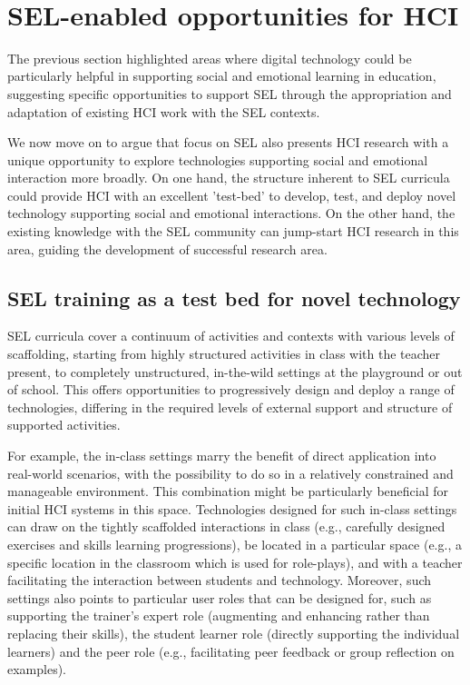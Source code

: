 \documentclass[prodmode,acmtochi]{acmsmall}
\begin{document}



\vfill ~ \pagebreak
\section{SEL-enabled opportunities for HCI} %
\label{sec:HCIopportunities}
The previous section highlighted areas where digital technology could be particularly helpful in supporting social and emotional learning in education, suggesting specific opportunities to support SEL through the appropriation and adaptation of existing HCI work with the SEL contexts. 

We now move on to argue that focus on SEL also presents HCI research with a unique opportunity to explore technologies supporting social and emotional interaction more broadly.
%
On one hand, the structure inherent to SEL curricula could provide HCI with an excellent 'test-bed' to develop, test, and deploy novel technology supporting social and emotional interactions. On the other hand, the existing knowledge 
with the SEL community can jump-start HCI research in this area, guiding the development of successful research area.

%
\subsection{SEL training as a test bed for novel technology}
SEL curricula cover a continuum of activities and contexts with various levels of scaffolding, starting from highly structured activities in class with the teacher present, to completely unstructured, in-the-wild settings at the playground or out of school. This offers opportunities to progressively design and deploy a range of technologies, differing in the required levels of external support and structure of supported activities. 

For example, the in-class settings marry the benefit of direct application into real-world scenarios, with the possibility to do so in a relatively constrained and manageable environment. This combination might be particularly beneficial for initial HCI systems in this space. Technologies designed for such in-class settings can draw on the tightly scaffolded interactions in class (e.g., carefully designed exercises and skills learning progressions), be located in a particular space (e.g., a specific location in the classroom which is used for role-plays), and with a teacher facilitating the interaction between students and technology.  Moreover, such settings also points to particular user roles that can be designed for, such as supporting the trainer's expert role (augmenting and enhancing rather than replacing their skills), the student learner role (directly supporting the individual learners) and the peer role (e.g., facilitating peer feedback or group reflection on examples). 
\end{document}
